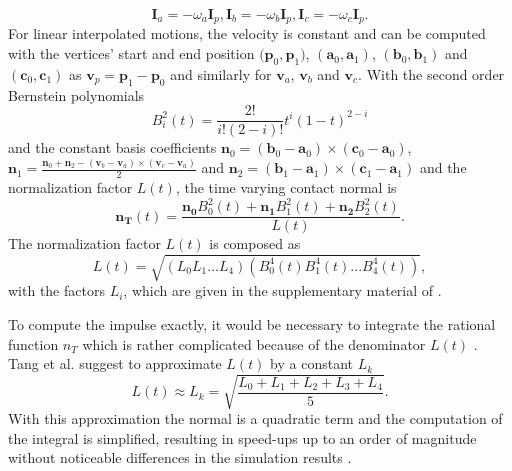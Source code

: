 \begin{equation}
     \mathbf I_a =- \omega_a \mathbf I_p, 
     \mathbf I_b =- \omega_b \mathbf I_p,
     \mathbf I_c =- \omega_c \mathbf I_p.
\end{equation}
For linear interpolated motions, the velocity is constant and can be computed with the vertices' start and end position $\mathbf (\mathbf p_0,\mathbf p_1)$, $(\mathbf a_0,\mathbf a_1)$, $(\mathbf b_0,\mathbf b_1)$ and $(\mathbf c_0,\mathbf c_1)$ as $\mathbf v_p=\mathbf p_1-\mathbf p_0$ and similarly for $\mathbf v_a$, $\mathbf v_b$ and $\mathbf v_c$.
With the second order Bernstein polynomials
\begin{equation}
B^2_i(t)=\frac{2!}{i!(2-i)!}t^i(1-t)^{2-i}
\end{equation}
and the constant basis coefficients $\mathbf n_0=(\mathbf b_0- \mathbf a_0) \times (\mathbf c_0-\mathbf a_0)$, $\mathbf n_1= \frac{\mathbf n_0+ \mathbf n_2 - (\mathbf v_b-\mathbf v_a) \times (\mathbf v_c - \mathbf v_a)}{2}$ and $\mathbf n_2=(\mathbf b_1- \mathbf a_1) \times (\mathbf c_1-\mathbf a_1)$ and the normalization factor $L(t)$, the time varying contact normal is
\begin{equation}
	\mathbf{n_T}(t)=\frac{\mathbf{n_0}B^2_0(t)+\mathbf{n_1}B^2_1(t)+\mathbf{n_2}B^2_2(t)}{L(t)}.
\end{equation}
The normalization factor $L(t)$ is composed as
\begin{equation}
	L(t)=\sqrt{(L_0L_1...L_4)(B^4_0(t)B^4_1(t)...B^4_4(t))},
\end{equation}
with the factors $L_i$, which are given in the supplementary material of \cite{TANG2012}.


To compute the impulse exactly, it would be necessary to integrate the rational function $n_T$ which is rather complicated because of the denominator $L(t)$ \cite{TANG2012}.
Tang et al. suggest to approximate $L(t)$ by a constant $L_k$
\begin{equation}
	L(t)\approx L_k=\sqrt{\frac{L_0+L_1+L_2+L_3+L_4}{5}}.
\end{equation}
With this approximation the normal is a quadratic term and the computation of the integral is simplified, resulting in speed-ups up to an order of magnitude without noticeable differences in the simulation results \cite{TANG2012}.

